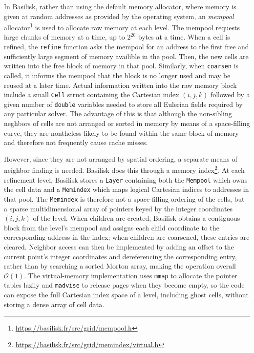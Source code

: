 In Basilisk, rather than using the default memory allocator, where memory is
given at random addresses as provided by the operating system, an
\emph{mempool} allocator\footnote{\url{https://basilisk.fr/src/grid/mempool.h}}
is used to allocate raw memory at each level. The mempool requests large chunks
of memory at a time, up to \(2^{20}\) bytes at a time. When a cell is refined,
the \texttt{refine} function asks the mempool for an address to the first free
and sufficiently large segment of memory availible in the pool. Then, the new
cells are written into the free block of memory in that pool. Similarly, when
\texttt{coarsen} is called, it informs the mempool that the block is no longer
used and may be reused at a later time. Actual information written into the raw
memory block include a small \texttt{Cell} struct containing the Cartesian
index \((i,j,k)\) followed by a given number of \texttt{double} variables
needed to store all Eulerian fields required by any particular solver. The
advantage of this is that although the non-sibling neghbors of cells are not
arranged or sorted in memory by means of a space-filling curve, they are
nontheless likely to be found within the same block of memory and therefore not
frequently cause cache misses.

However, since they are not arranged by spatial ordering, a separate means of
neighbor finding is needed. Basilisk does this through a memory
index\footnote{\url{https://basilisk.fr/src/grid/memindex/virtual.h}}. At each
refinement level, Basilisk stores a \texttt{Layer} containing both the
\texttt{Mempool} which owns the cell data and a \texttt{Memindex} which maps
logical Cartesian indices to addresses in that pool. The \texttt{Memindex} is
therefore not a space-filling ordering of the cells, but a sparse
multidimensional array of pointers keyed by the integer coordinates \((i,j,k)\)
of the level. When children are created, Basilisk obtains a contiguous block
from the level's mempool and assigns each child coordinate to the corresponding
address in the index; when children are coarsened, these entries are cleared.
Neighbor access can then be implemented by adding an offset to the current
point's integer coordinates and dereferencing the corresponding entry, rather
than by searching a sorted Morton array, making the operation overall
\(\mathcal{O}(1)\). The virtual-memory implementation uses \texttt{mmap} to
allocate the pointer tables lazily and \texttt{madvise} to release pages when
they become empty, so the code can expose the full Cartesian index space of a
level, including ghost cells, without storing a dense array of cell data.

